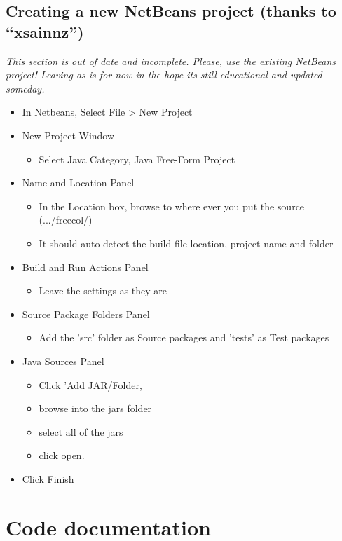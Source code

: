 \documentclass[12pt]{book}
\begin{document}
\hypertarget{Creating a new NetBeans project}{\subsection{Creating a new NetBeans project (thanks to ``xsainnz'')}}

\emph{This section is out of date and incomplete.
Please, use the existing NetBeans project!
Leaving as-is for now in the hope its still educational and updated someday.}

\begin{itemize}
\item In Netbeans, Select File > New Project
\item New Project Window
\begin{itemize}
\item Select Java Category, Java Free-Form Project
\end{itemize}
\item Name and Location Panel
\begin{itemize}
\item In the Location box, browse to where ever you put the source (.../freecol/)
\item It should auto detect the build file location, project name and folder
\end{itemize}
\item Build and Run Actions Panel
\begin{itemize}
\item Leave the settings as they are
\end{itemize}
\item Source Package Folders Panel
\begin{itemize}
\item Add the 'src' folder as Source packages and 'tests' as Test packages
\end{itemize}
\item Java Sources Panel
\begin{itemize}
\item Click 'Add JAR/Folder,
\item browse into the jars folder
\item select all of the jars
\item click open.
\end{itemize}
\item Click Finish
\end{itemize}

\hypertarget{Code documentation}{\section{Code documentation}}
\end{document}
